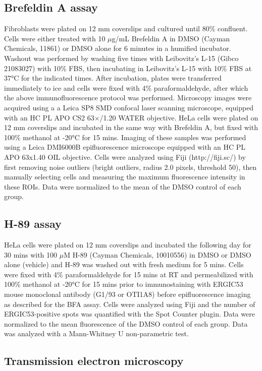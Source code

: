 \subsection{Brefeldin A assay}

Fibroblasts were plated on 12 mm coverslips and cultured until 80\% confluent. Cells were either treated with 10 $\mu$g/mL Brefeldin A in DMSO (Cayman Chemicals, 11861) or DMSO alone for 6 minutes in a humified incubator. Washout was performed by washing five times with Leibovitz’s L-15 (Gibco 21083027) with 10\% FBS, then incubating in Leibovitz’s L-15 with 10\% FBS at 37°C for the indicated times. After incubation, plates were transferred immediately to ice and cells were fixed with 4\% paraformaldehyde, after which the above immunofluorescence protocol was performed. Microscopy images were acquired using a a Leica SP8 SMD confocal laser scanning microscope, equipped with an HC PL APO CS2 63$\times$/1.20 WATER objective. HeLa cells were plated on 12 mm coverslips and incubated in the same way with Brefeldin A, but fixed with 100\% methanol at -20°C for 15 mins. Imaging of these samples was performed using a Leica DMI6000B epifluorescence microscope equipped with an HC PL APO 63x1.40 OIL objective. Cells were analyzed using Fiji (http://fiji.sc/) by first removing noise outliers (bright outliers, radius 2.0 pixels, threshold 50), then manually selecting cells and measuring the maximum fluorescence intensity in these ROIs. Data were normalized to the mean of the DMSO control of each group.

\subsection{H-89 assay}

HeLa cells were plated on 12 mm coverslips and incubated the following day for 30 mins with 100 $\mu$M H-89 (Cayman Chemicals, 10010556) in DMSO or DMSO alone (vehicle) and H-89 was washed out with fresh medium for 5 mins. Cells were fixed with 4\% paraformaldehyde for 15 mins at RT and permeabilized with 100\% methanol at -20°C for 15 mins prior to immunostaining with ERGIC53 mouse monoclonal antibody (G1/93 or OTI1A8) before epifluorescence imaging as described for the BFA assay. Cells were analyzed using Fiji and the number of ERGIC53-positive spots was quantified with the Spot Counter plugin. Data were normalized to the mean fluorescence of the DMSO control of each group. Data was analyzed with a Mann-Whitney U non-parametric test. 

\subsection{Transmission electron microscopy}

